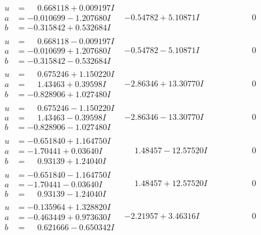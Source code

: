 \documentclass[1p]{elsarticle_modified}
\theoremstyle{definition}
\begin{document}
$$\begin{array}{c|c|c}
\begin{aligned}
u &= \phantom{-}0.668118 + 0.009197 I \\
a &= -0.010699 - 1.207680 I \\
b &= -0.315842 + 0.532684 I\end{aligned}
 & -0.54782 + 5.10871 I & \phantom{-0.000000 } 0 \\ \hline\begin{aligned}
u &= \phantom{-}0.668118 - 0.009197 I \\
a &= -0.010699 + 1.207680 I \\
b &= -0.315842 - 0.532684 I\end{aligned}
 & -0.54782 - 5.10871 I & \phantom{-0.000000 } 0 \\ \hline\begin{aligned}
u &= \phantom{-}0.675246 + 1.150220 I \\
a &= \phantom{-}1.43463 + 0.39598 I \\
b &= -0.828906 + 1.027480 I\end{aligned}
 & -2.86346 + 13.30770 I & \phantom{-0.000000 } 0 \\ \hline\begin{aligned}
u &= \phantom{-}0.675246 - 1.150220 I \\
a &= \phantom{-}1.43463 - 0.39598 I \\
b &= -0.828906 - 1.027480 I\end{aligned}
 & -2.86346 - 13.30770 I & \phantom{-0.000000 } 0 \\ \hline\begin{aligned}
u &= -0.651840 + 1.164750 I \\
a &= -1.70441 + 0.03640 I \\
b &= \phantom{-}0.93139 + 1.24040 I\end{aligned}
 & \phantom{-}1.48457 - 12.57520 I & \phantom{-0.000000 } 0 \\ \hline\begin{aligned}
u &= -0.651840 - 1.164750 I \\
a &= -1.70441 - 0.03640 I \\
b &= \phantom{-}0.93139 - 1.24040 I\end{aligned}
 & \phantom{-}1.48457 + 12.57520 I & \phantom{-0.000000 } 0 \\ \hline\begin{aligned}
u &= -0.135964 + 1.328820 I \\
a &= -0.463449 + 0.973630 I \\
b &= \phantom{-}0.621666 - 0.650342 I\end{aligned}
 & -2.21957 + 3.46316 I & \phantom{-0.000000 } 0 \\ \hline\begin{aligned}

\end{aligned}
\end{array}$$
\end{document}
